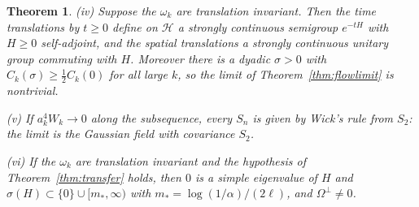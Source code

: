 \documentclass[11pt]{amsart}
\newtheorem{theorem}{Theorem}[section]
\theoremstyle{definition}
\theoremstyle{remark}
\numberwithin{equation}{section}
\begin{document}
\begin{theorem}
\textup{(iv)} Suppose the $\omega_k$ are translation invariant. Then the
time translations by $t\ge0$ define on $\mathcal H$ a strongly continuous
semigroup $e^{-tH}$ with $H\ge0$ self-adjoint, and the spatial translations a
strongly continuous unitary group commuting with $H$. Moreover there is a
dyadic $\sigma>0$ with $C_k(\sigma)\ge\frac12C_k(0)$ for all large $k$, so
the limit of Theorem~\textup{\ref{thm:flowlimit}} is nontrivial.

\textup{(v)} If $a_k^4W_k\to0$ along the subsequence, every $S_n$ is given by
Wick's rule from $S_2$: the limit is the Gaussian field with covariance $S_2$.

\textup{(vi)} If the $\omega_k$ are translation invariant and the
hypothesis of Theorem~\textup{\ref{thm:transfer}} holds, then $0$ is a simple
eigenvalue of $H$ and $\sigma(H)\subset\{0\}\cup[m_*,\infty)$ with
$m_*=\log(1/\alpha)/(2\ell)$, and $\Omega^\perp\ne0$.
\end{theorem}
\end{document}
